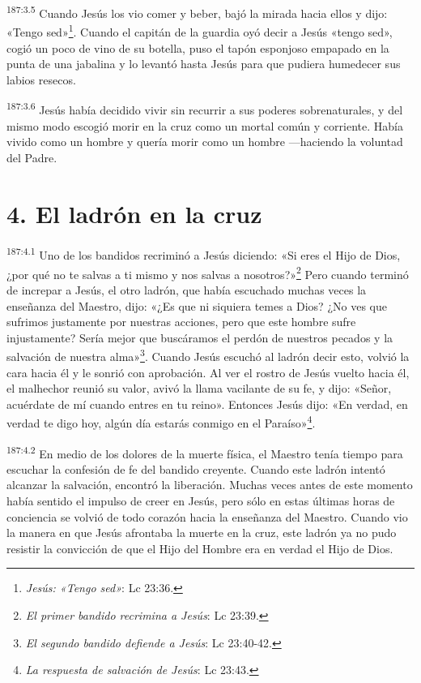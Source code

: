 \par 
\textsuperscript{187:3.5} Cuando Jesús los vio comer y beber, bajó la mirada hacia ellos y dijo: «Tengo sed»\footnote{\textit{Jesús: «Tengo sed»}: Lc 23:36.}. Cuando el capitán de la guardia oyó decir a Jesús «tengo sed», cogió un poco de vino de su botella, puso el tapón esponjoso empapado en la punta de una jabalina y lo levantó hasta Jesús para que pudiera humedecer sus labios resecos.

\par 
\textsuperscript{187:3.6} Jesús había decidido vivir sin recurrir a sus poderes sobrenaturales, y del mismo modo escogió morir en la cruz como un mortal común y corriente. Había vivido como un hombre y quería morir como un hombre ---haciendo la voluntad del Padre.

\section*{4. El ladrón en la cruz}
\par 
\textsuperscript{187:4.1} Uno de los bandidos recriminó a Jesús diciendo: «Si eres el Hijo de Dios, ¿por qué no te salvas a ti mismo y nos salvas a nosotros?»\footnote{\textit{El primer bandido recrimina a Jesús}: Lc 23:39.} Pero cuando terminó de increpar a Jesús, el otro ladrón, que había escuchado muchas veces la enseñanza del Maestro, dijo: «¿Es que ni siquiera temes a Dios? ¿No ves que sufrimos justamente por nuestras acciones, pero que este hombre sufre injustamente? Sería mejor que buscáramos el perdón de nuestros pecados y la salvación de nuestra alma»\footnote{\textit{El segundo bandido defiende a Jesús}: Lc 23:40-42.}. Cuando Jesús escuchó al ladrón decir esto, volvió la cara hacia él y le sonrió con aprobación. Al ver el rostro de Jesús vuelto hacia él, el malhechor reunió su valor, avivó la llama vacilante de su fe, y dijo: «Señor, acuérdate de mí cuando entres en tu reino». Entonces Jesús dijo: «En verdad, en verdad te digo hoy, algún día estarás conmigo en el Paraíso»\footnote{\textit{La respuesta de salvación de Jesús}: Lc 23:43.}.

\par 
\textsuperscript{187:4.2} En medio de los dolores de la muerte física, el Maestro tenía tiempo para escuchar la confesión de fe del bandido creyente. Cuando este ladrón intentó alcanzar la salvación, encontró la liberación. Muchas veces antes de este momento había sentido el impulso de creer en Jesús, pero sólo en estas últimas horas de conciencia se volvió de todo corazón hacia la enseñanza del Maestro. Cuando vio la manera en que Jesús afrontaba la muerte en la cruz, este ladrón ya no pudo resistir la convicción de que el Hijo del Hombre era en verdad el Hijo de Dios.

